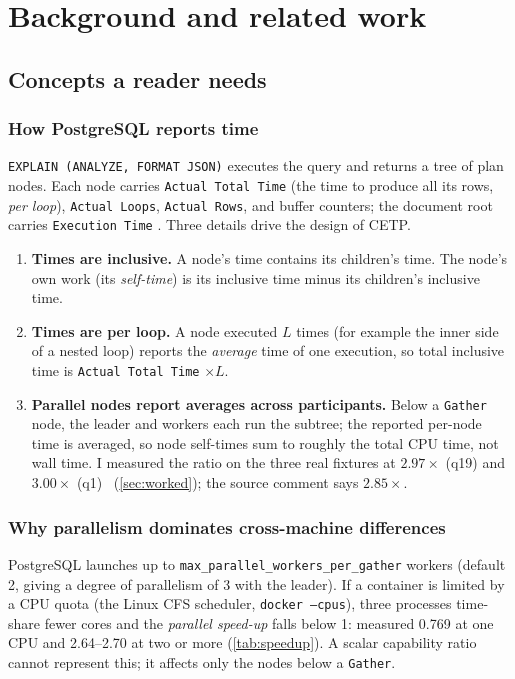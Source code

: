 \chapter{Background and related work}\label{ch:background}

\section{Concepts a reader needs}
\subsection{How PostgreSQL reports time}
\texttt{EXPLAIN (ANALYZE, FORMAT JSON)} executes the query and returns a tree of plan nodes. Each node
carries \texttt{Actual Total Time} (the time to produce all its rows, \emph{per loop}),
\texttt{Actual Loops}, \texttt{Actual Rows}, and buffer counters; the document root carries
\texttt{Execution Time} \citep{pg:explain}. Three details drive the design of CETP.
\begin{enumerate}
\item \textbf{Times are inclusive.} A node's time contains its children's time. The node's own work (its
  \emph{self-time}) is its inclusive time minus its children's inclusive time.
\item \textbf{Times are per loop.} A node executed $L$ times (for example the inner side of a nested loop)
  reports the \emph{average} time of one execution, so total inclusive time is \texttt{Actual Total Time}
  $\times L$.
\item \textbf{Parallel nodes report averages across participants.} Below a \texttt{Gather} node, the
  leader and workers each run the subtree; the reported per-node time is averaged, so node self-times sum to
  roughly the total CPU time, not wall time. I measured the ratio on the three real fixtures at
  $2.97\times$ (q19) and $3.00\times$ (q1) \evRUN\ (\cref{sec:worked}); the source comment says $2.85\times$.
\end{enumerate}

\subsection{Why parallelism dominates cross-machine differences}
PostgreSQL launches up to \texttt{max\_parallel\_workers\_per\_gather} workers (default 2, giving a
degree of parallelism of 3 with the leader). If a container is limited by a CPU quota (the Linux CFS
scheduler, \texttt{docker --cpus}), three processes time-share fewer cores and the \emph{parallel
speed-up} falls below 1: measured 0.769 at one CPU and 2.64--2.70 at two or more (\cref{tab:speedup}).
A scalar capability ratio cannot represent this; it affects only the nodes below a \texttt{Gather}.


